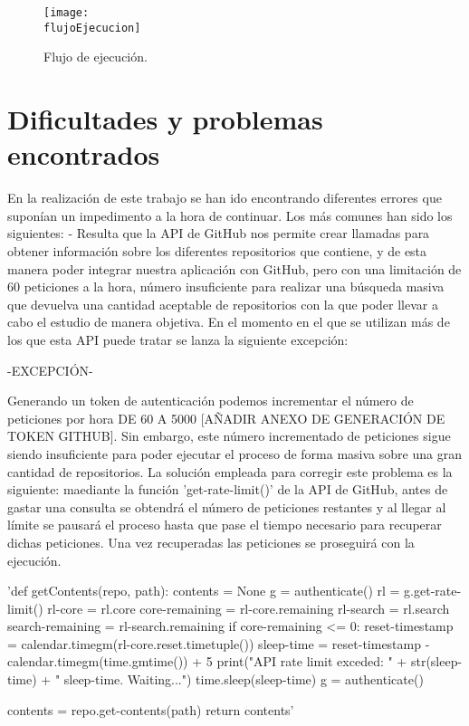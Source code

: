 \begin{figure}[h]
    \centering
    \texttt{[image: \\flujoEjecucion]}
    \caption{Flujo de ejecución.}
\end{figure}

\section{Dificultades y problemas encontrados}
En la realización de este trabajo se han ido encontrando diferentes errores que suponían un impedimento a la hora de continuar. Los más comunes han sido los siguientes:
- Resulta que la API de GitHub nos permite crear llamadas para obtener información sobre los diferentes repositorios que contiene, y de esta manera poder integrar nuestra aplicación con GitHub, pero con una limitación de 60 peticiones a la hora, número insuficiente para realizar una búsqueda masiva que devuelva una cantidad aceptable de repositorios con la que poder llevar a cabo el estudio de manera objetiva. En el momento en el que se utilizan más de los que esta API puede tratar se lanza la siguiente excepción: 

-EXCEPCIÓN-

Generando un token de autenticación podemos incrementar el número de peticiones por hora DE 60 A 5000 [AÑADIR ANEXO DE GENERACIÓN DE TOKEN GITHUB]. Sin embargo, este número incrementado de peticiones sigue siendo insuficiente para poder ejecutar el proceso de forma masiva sobre una gran cantidad de repositorios.
La solución empleada para corregir este problema es la siguiente: maediante la función 'get-rate-limit()' de la API de GitHub, antes de gastar una consulta se obtendrá el número de peticiones restantes y al llegar al límite se pausará el proceso hasta que pase el tiempo necesario para recuperar dichas peticiones. Una vez recuperadas las peticiones se proseguirá con la ejecución.

'def getContents(repo, path):
    contents = None
    g = authenticate()
    rl = g.get-rate-limit()
    rl-core = rl.core
    core-remaining = rl-core.remaining
    rl-search = rl.search
    search-remaining = rl-search.remaining
    if core-remaining <= 0:
        reset-timestamp = calendar.timegm(rl-core.reset.timetuple())
        sleep-time = reset-timestamp - calendar.timegm(time.gmtime()) + 5
        print("API rate limit exceded: " + str(sleep-time) + " sleep-time. Waiting...")
        time.sleep(sleep-time)
        g = authenticate()

    contents = repo.get-contents(path)
    return contents'

